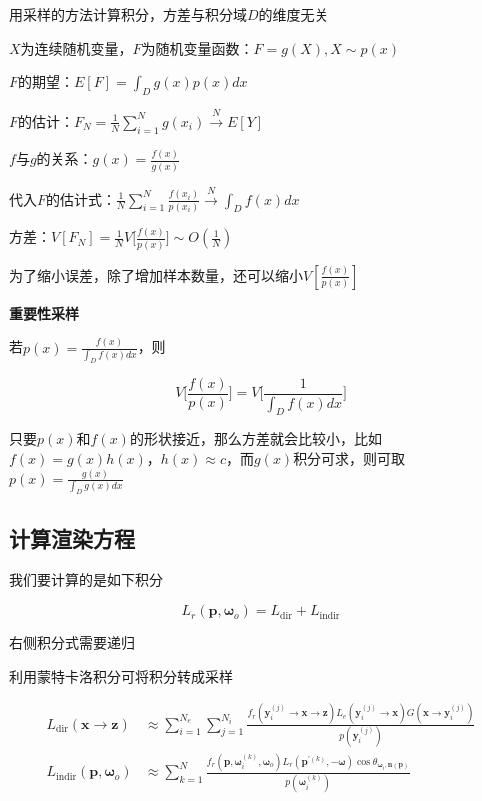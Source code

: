 \documentclass[14pt]{scrartcl} %
\begin{document}
用采样的方法计算积分，方差与积分域$D$的维度无关

$X$为连续随机变量，$F$为随机变量函数：$F=g(X),X\sim p(x)$

$F$的期望：$E[F]=\int_Dg(x)p(x)dx$

$F$的估计：$F_N=\frac{1}{N}\sum\limits_{i=1}^Ng(x_i)\xrightarrow[]{N}E[Y]$

$f$与$g$的关系：$g(x)=\frac{f(x)}{g(x)}$

代入$F$的估计式：$\frac{1}{N}\sum\limits_{i=1}^N\frac{f(x_i)}{p(x_i)}\xrightarrow[]{N}\int_D f(x)dx$

方差：$V[F_N]=\frac{1}{N}V\Big[\frac{f(x)}{p(x)}\Big]\sim O(\frac{1}{N})$

为了缩小误差，除了增加样本数量，还可以缩小$V[\frac{f(x)}{p(x)}]$

\textbf{重要性采样}

若$p(x)=\frac{f(x)}{\int_D f(x)dx}$，则

\begin{equation}
V\Big[\frac{f(x)}{p(x)}\Big]=V\Big[\frac{1}{\int_D f(x)dx}\Big]
\end{equation}

只要$p(x)$和$f(x)$的形状接近，那么方差就会比较小，比如$f(x)=g(x)h(x)$，$h(x)\approx c$，而$g(x)$积分可求，则可取$p(x)=\frac{g(x)}{\int_D g(x)dx}$


\subsection{计算渲染方程}

我们要计算的是如下积分

\begin{equation}
L_r(\pmb{p},\pmb{\omega}_o)=L_{\text{dir}}+L_{\text{indir}}
\end{equation}

右侧积分式需要递归

利用蒙特卡洛积分可将积分转成采样

\begin{equation}
\begin{aligned}
L_{\text{dir}}(\pmb{x}\to\pmb{z})
&\approx\sum_{i=1}^{N_e}\sum_{j=1}^{N_i}\frac{f_r(\pmb{y}_i^{(j)}\to\pmb{x}\to\pmb{z})L_e(\pmb{y}_i^{(j)}\to\pmb{x})G(\pmb{x}\to\pmb{y}_i^{(j)})}{p(\pmb{y}_i^{(j)})}\\
L_{\text{indir}}(\pmb{p},\pmb{\omega}_o)
&\approx\sum_{k=1}^{N}\frac{f_r(\pmb{p},\pmb{\omega}_i^{(k)},\pmb{\omega}_o)L_r(\pmb{p}^{\prime(k)},-\pmb{\omega})\cos\theta_{\pmb{\omega}_i,\pmb{n}(\pmb{p})}}{p(\pmb{\omega}_i^{(k)})}
\end{aligned}
\end{equation}
\end{document}
